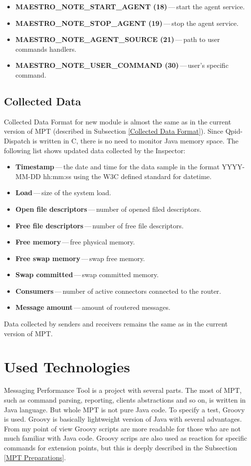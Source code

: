 \begin{itemize}
	\setlength\itemsep{0em}
	\item \textbf{MAESTRO\_NOTE\_START\_AGENT (18)}\,---\,start the agent service.
	\item \textbf{MAESTRO\_NOTE\_STOP\_AGENT (19)}\,---\,stop the agent service.
	\item \textbf{MAESTRO\_NOTE\_AGENT\_SOURCE (21)}\,---\,path to user commands handlers.
	\item \textbf{MAESTRO\_NOTE\_USER\_COMMAND (30)}\,---\,user's specific command.
\end{itemize}

\subsection{Collected Data}
\label{Collected Data}
Collected Data Format for new module is almost the same as in the current version of MPT (described in Subsection \ref{Collected Data Format}). Since Qpid-Dispatch is written in C, there is no need to monitor Java memory space. The following list shows updated data collected by the Inspector:

\begin{itemize}
	\setlength\itemsep{0em}
	\item \textbf{Timestamp}\,---\,the date and time for the data sample in the format YYYY-MM-DD hh:mm:ss using the W3C defined standard for datetime.
	\item \textbf{Load}\,---\,size of the system load.
	\item \textbf{Open file descriptors}\,---\,number of opened filed descriptors.
	\item \textbf{Free file descriptors}\,---\,number of free file descriptors.
	\item \textbf{Free memory}\,---\,free physical memory.
	\item \textbf{Free swap memory}\,---\,swap free memory.
	\item \textbf{Swap committed}\,---\,swap committed memory.
	\item \textbf{Consumers}\,---\,number of active connectors connected to the router.
	\item \textbf{Message amount}\,---\,amount of routered messages.
\end{itemize}
Data collected by senders and receivers remains the same as in the current version of MPT.

\section{Used Technologies}
Messaging Performance Tool is a project with several parts. The most of MPT, such as command parsing, reporting, clients abstractions and so on, is written in Java language. But whole MPT is not pure Java code. To specify a test, Groovy is used. Groovy is basically lightweight version of Java with several advantages. From my point of view Groovy scripts are more readable for those who are not much familiar with Java code. Groovy scrips are also used as reaction for specific commands for extension points, but this is deeply described in the Subsection \ref{MPT Preparations}.

